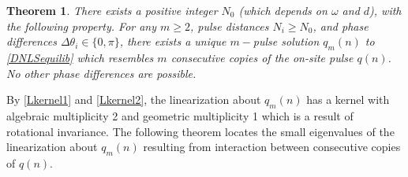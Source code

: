 \documentclass[12pt]{elsarticle}
\newtheorem{theorem}{Theorem}
\begin{document}
\begin{theorem}\label{DNLSexisttheorem}
There exists a positive integer $N_0$ (which depends on $\omega$ and $d$), with the following property. For any $m \geq 2$, pulse distances $N_i \geq N_0$, and phase differences $\Delta\theta_i \in \{0, \pi\}$, there exists a unique $m-$pulse solution $q_m(n)$ to \cref{DNLSequilib} which resembles $m$ consecutive copies of the on-site pulse $q(n)$. No other phase differences are possible.
\end{theorem}

By \cref{Lkernel1} and \cref{Lkernel2}, the linearization about $q_m(n)$ has a kernel with algebraic multiplicity 2 and geometric multiplicity 1 which is a result of rotational invariance. The following theorem locates the small eigenvalues of the linearization about $q_m(n)$ resulting from interaction between consecutive copies of $q(n)$. 
\end{document}
